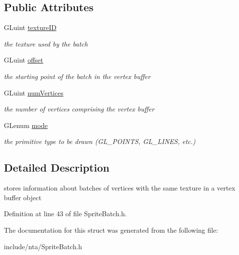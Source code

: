 \subsection*{Public Attributes}
\begin{DoxyCompactItemize}
\item 
\mbox{\label{structnta_1_1RenderBatch_a65aa121e11783396f753c8f937fe9d04}} 
G\+Luint \hyperlink{structnta_1_1RenderBatch_a65aa121e11783396f753c8f937fe9d04}{texture\+ID}
\begin{DoxyCompactList}\small\item\em the texture used by the batch \end{DoxyCompactList}\item 
\mbox{\label{structnta_1_1RenderBatch_ab73ef79a5cbf8b60ad9991eb0a1ea9e6}} 
G\+Luint \hyperlink{structnta_1_1RenderBatch_ab73ef79a5cbf8b60ad9991eb0a1ea9e6}{offset}
\begin{DoxyCompactList}\small\item\em the starting point of the batch in the vertex buffer \end{DoxyCompactList}\item 
\mbox{\label{structnta_1_1RenderBatch_a18e1cb5ff84364540a871db321557b7c}} 
G\+Luint \hyperlink{structnta_1_1RenderBatch_a18e1cb5ff84364540a871db321557b7c}{num\+Vertices}
\begin{DoxyCompactList}\small\item\em the number of vertices comprising the vertex buffer \end{DoxyCompactList}\item 
\mbox{\label{structnta_1_1RenderBatch_ae2cc5e3b2e34aff278ba863443b0fdae}} 
G\+Lenum \hyperlink{structnta_1_1RenderBatch_ae2cc5e3b2e34aff278ba863443b0fdae}{mode}
\begin{DoxyCompactList}\small\item\em the primitive type to be drawn (G\+L\+\_\+\+P\+O\+I\+N\+TS, G\+L\+\_\+\+L\+I\+N\+ES, etc.) \end{DoxyCompactList}\end{DoxyCompactItemize}


\subsection{Detailed Description}
stores information about batches of vertices with the same texture in a vertex buffer object 

Definition at line 43 of file Sprite\+Batch.\+h.



The documentation for this struct was generated from the following file\+:\begin{DoxyCompactItemize}
\item 
include/nta/Sprite\+Batch.\+h\end{DoxyCompactItemize}
